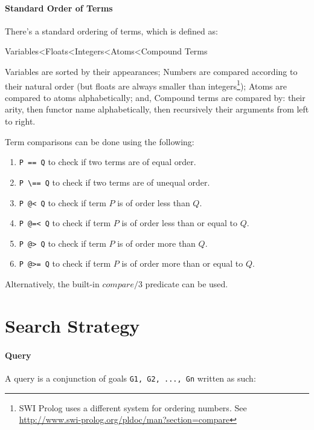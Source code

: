 \documentclass{article}
\begin{document}
\begin{multicols}{2}
  \paragraph{Standard Order of Terms} There's a standard ordering of terms, which is defined as:
  
  \noindent \small Variables\textless Floats\textless Integers\textless Atoms\textless Compound Terms
  
  Variables are sorted by their appearances; Numbers are compared according to their natural order (but floats are always smaller than integers\footnote{SWI Prolog uses a different system for ordering numbers. See \href{http://www.swi-prolog.org/pldoc/man?section=compare}{http://www.swi-prolog.org/pldoc/man?section=compare}}); Atoms are compared to atoms alphabetically; and, Compound terms are compared by: their arity, then functor name alphabetically, then recursively their arguments from left to right. 
  
  Term comparisons can be done using the following:
  
  \begin{enumerate}
  \item \lstinline{P == Q} to check if two terms are of equal order.
  \item \lstinline{P \== Q} to check if two terms are of unequal order.
  \item \lstinline{P @< Q} to check if term $P$ is of order less than $Q$.
  \item \lstinline{P @=< Q} to check if term $P$ is of order less than or equal to $Q$.
  \item \lstinline{P @> Q} to check if term $P$ is of order more than $Q$.
  \item \lstinline{P @>= Q} to check if term $P$ is of order more than or equal to $Q$.
  \end{enumerate}
  
  Alternatively, the built-in $compare/3$ predicate can be used.
  
  \section{Search Strategy}
  
  \paragraph{Query} A query is a conjunction of goals \lstinline{G1, G2, ..., Gn} written as such:
  

\end{multicols}
\end{document}
